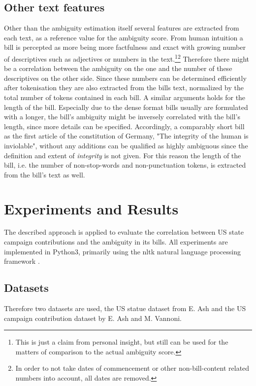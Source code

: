\documentclass{custom_report}
\begin{document}
\section{Other text features}
Other than the ambiguity estimation itself several features are extracted from each text, as a reference value for the ambiguity score. From human intuition a bill is percepted as more being more factfulness and exact with growing number of descriptives such as adjectives or numbers in the text.\footnote{This is just a claim from personal insight, but still can be used for the matters of comparison to the actual ambiguity score.}\footnote{In order to not take dates of commencement or other non-bill-content related numbers into account, all dates are removed.} Therefore there might be a correlation between the ambiguity on the one and the number of these descriptives on the other side. Since these numbers can be determined efficiently after tokenisation they are also extracted from the bills text, normalized by the total number of tokens contained in each bill.  
\newline 
A similar arguments holds for the length of the bill. Especially due to the dense format bills usually are formulated with a longer, the bill's ambiguity might be inversely correlated with the bill's length, since more details can be specified. Accordingly, a comparably short bill as the first article of the constitution of Germany, "The integrity of the human is inviolable", without any additions can be qualified as highly ambiguous since the definition and extent of \textit{integrity} is not given. For this reason the length of the bill, i.e. the number of non-stop-words and non-punctuation tokens, is extracted from the bill's text as well. 

\chapter{Experiments and Results}
\label{cha:exp_and_results}
The described approach is applied to evaluate the correlation between US state campaign contributions and the ambiguity in its bills. All experiments are implemented in Python3, primarily using the nltk natural language processing framework \cite{nltk}. 

\section{Datasets}
Therefore two datasets are used, the US statue dataset from E. Ash and the US campaign contribution dataset by E. Ash and M. Vannoni. 
\end{document}
